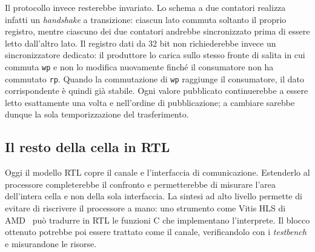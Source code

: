Il protocollo invece resterebbe invariato. Lo schema a due contatori realizza
infatti un \emph{handshake} a transizione: ciascun lato commuta soltanto il
proprio registro, mentre ciascuno dei due contatori andrebbe sincronizzato
prima di essere letto dall'altro lato. Il registro dati da 32 bit non
richiederebbe invece un sincronizzatore dedicato: il produttore lo carica
sullo stesso fronte di salita in cui commuta \texttt{wp} e non lo modifica
nuovamente finché il consumatore non ha commutato \texttt{rp}. Quando la
commutazione di \texttt{wp} raggiunge il consumatore, il dato corrispondente è
quindi già stabile. Ogni valore pubblicato continuerebbe a essere letto
esattamente una volta e nell'ordine di pubblicazione; a cambiare sarebbe dunque
la sola temporizzazione del trasferimento.

\subsection{Il resto della cella in RTL}

Oggi il modello RTL copre il canale e l'interfaccia di comunicazione.
Estenderlo al processore completerebbe il confronto e permetterebbe di misurare
l'area dell'intera cella e non della sola interfaccia. La sintesi ad alto
livello permette di evitare di riscrivere il processore a mano: uno strumento
come Vitis HLS di AMD~\cite{VitisHLS} può
tradurre in RTL le funzioni C che implementano l'interprete. Il blocco ottenuto
potrebbe poi essere trattato come il canale, verificandolo con i
\emph{testbench} e misurandone le risorse. 
